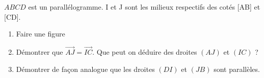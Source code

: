 
$ABCD$ est un parallélogramme.
I et J sont les milieux respectifs des cotés [AB] et [CD].
\begin{enumerate}
\item Faire une figure
\item Démontrer que $\overrightarrow{AJ}=\overrightarrow{IC}$. Que peut on déduire des droites $(AJ)$ et $(IC)$ ?
\item Démontrer de façon analogue que les droites $(DI)$ et $(JB)$ sont parallèles.
\end{enumerate}